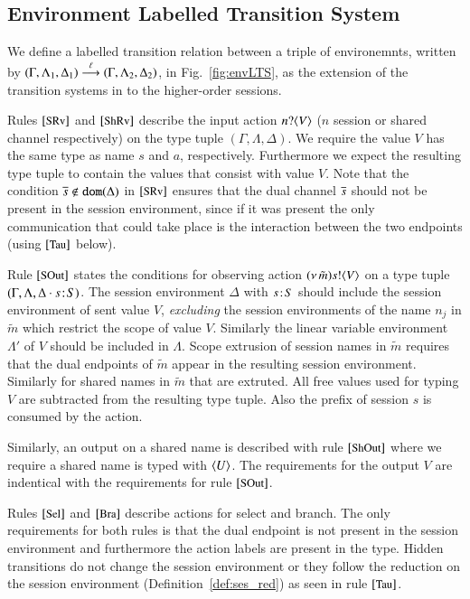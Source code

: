\subsection{Environment Labelled Transition System}
\label{ss:elts}
\noi 
We define a labelled transition relation between 
a triple of environemnts, 
written by  
$(\Gamma, \Lambda_1, \Delta_1) \stackrel{\ell}{\longrightarrow} (\Gamma, \Lambda_2, \Delta_2)$, 
in Fig.~\ref{fig:envLTS}, 
as the extension of the transition systems
in \cite{DBLP:conf/forte/KouzapasYH11,KY13,dkphdthesis} 
to the higher-order sessions. 

Rules $\eltsrule{SRv}$ and $\eltsrule{ShRv}$ describe the input action
$n ? \langle V \rangle$ ($n$ session or shared channel respectively) on the
type tuple $(\Gamma, \Lambda, \Delta)$.  We require the value $V$ has
the same type as name $s$ and $a$, respectively.  Furthermore we
expect the resulting type tuple to contain the values that consist
with value $V$. Note that the condition $\overline{s} \notin \mathtt{dom}(\Delta)$
in $\eltsrule{SRv}$ ensures that 
the dual channel $\overline{s}$ should not be
present in the session environment, since if it was present
the only communication that could take place is the interaction
between the two endpoints (using $\eltsrule{Tau}$ below).

Rule $\eltsrule{SOut}$ states the conditions for observing action
$(\nu\, \tilde{m}) s ! \langle V \rangle$ on a type tuple $(\Gamma, \Lambda, \Delta\cdot s \! : \! S)$. 
The session environment $\Delta$ with $s \! : \! S$ 
should include the session environment of sent value $V$, 
{\em excluding} the session environments of the name $n_j$ 
in $\tilde{m}$ which restrict the scope of value $V$. 
Similarly the linear variable environment 
$\Lambda'$ of $V$ should be included in $\Lambda$. 
Scope extrusion of session names in $\tilde{m}$ requires
that the dual endpoints of $\tilde{m}$ appear in
the resulting session environment. Similarly for shared 
names in $\tilde{m}$ that are extruted.  
All free values used for typing $V$ are subtracted from the
resulting type tuple. Also the prefix of session $s$ is consumed
by the action.

Similarly, an output on a shared name is described
with rule $\eltsrule{ShOut}$ where we require a shared name
is typed with $\langle U \rangle$. The requirements for
the output $V$ are indentical with the requirements for
rule $\eltsrule{SOut}$.

Rules $\eltsrule{Sel}$ and $\eltsrule{Bra}$ describe actions for
select and branch. The only requirements for both
rules is that the dual endpoint is not present in the session
environment and furthermore the action labels are present
in the type.
Hidden transitions do not change the session environment
or they follow the reduction on the session
environment (Definition~\ref{def:ses_red}) as seen in rule
$\eltsrule{Tau}$.

